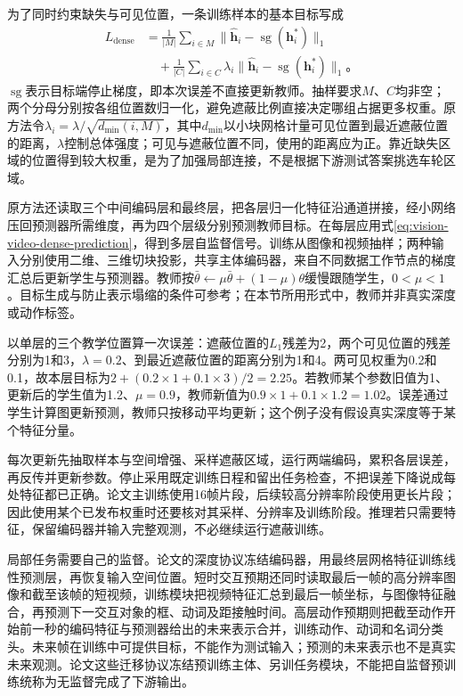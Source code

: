 为了同时约束缺失与可见位置，一条训练样本的基本目标写成
\begin{equation}
 \begin{aligned}
  L_{\mathrm{dense}}
  &=\frac{1}{|M|}\sum_{i\in M}
    \lVert\widehat{\bm{h}}_i-\operatorname{sg}(\bm{h}^{*}_i)\rVert_1
   \\
  &\quad+\frac{1}{|C|}\sum_{i\in C}\lambda_i
    \lVert\widehat{\bm{h}}_i-\operatorname{sg}(\bm{h}^{*}_i)\rVert_1\text{。}
 \end{aligned}
  \label{eq:vision-video-dense-prediction}
\end{equation}
$\operatorname{sg}$表示目标端停止梯度，即本次误差不直接更新教师。抽样要求$M$、$C$均非空；两个分母分别按各组位置数归一化，避免遮蔽比例直接决定哪组占据更多权重。原方法令$\lambda_i=\lambda/\sqrt{d_{\min}(i,M)}$，其中$d_{\min}$以小块网格计量可见位置到最近遮蔽位置的距离，$\lambda$控制总体强度；可见与遮蔽位置不同，使用的距离应为正。靠近缺失区域的位置得到较大权重，是为了加强局部连接，不是根据下游测试答案挑选车轮区域。

原方法还读取三个中间编码层和最终层，把各层归一化特征沿通道拼接，经小网络压回预测器所需维度，再为四个层级分别预测教师目标。在每层应用式\eqref{eq:vision-video-dense-prediction}，得到多层自监督信号。训练从图像和视频抽样；两种输入分别使用二维、三维切块投影，共享主体编码器，来自不同数据工作节点的梯度汇总后更新学生与预测器。教师按$\bar{\theta}\leftarrow\mu\bar{\theta}+(1-\mu)\theta$缓慢跟随学生，$0<\mu<1$。目标生成与防止表示塌缩的条件可参考；在本节所用形式中，教师并非真实深度或动作标签。

以单层的三个教学位置算一次误差：遮蔽位置的$L_1$残差为2，两个可见位置的残差分别为1和3，$\lambda=0.2$、到最近遮蔽位置的距离分别为1和4。两可见权重为0.2和0.1，故本层目标为$2+(0.2\times1+0.1\times3)/2=2.25$。若教师某个参数旧值为1、更新后的学生值为1.2、$\mu=0.9$，教师新值为$0.9\times1+0.1\times1.2=1.02$。误差通过学生计算图更新预测，教师只按移动平均更新；这个例子没有假设真实深度等于某个特征分量。

每次更新先抽取样本与空间增强、采样遮蔽区域，运行两端编码，累积各层误差，再反传并更新参数。停止采用既定训练日程和留出任务检查，不把误差下降说成每处特征都已正确。论文主训练使用16帧片段，后续较高分辨率阶段使用更长片段；因此使用某个已发布权重时还要核对其采样、分辨率及训练阶段。推理若只需要特征，保留编码器并输入完整观测，不必继续运行遮蔽训练。

局部任务需要自己的监督。论文的深度协议冻结编码器，用最终层网格特征训练线性预测层，再恢复输入空间位置。短时交互预期还同时读取最后一帧的高分辨率图像和截至该帧的短视频，训练模块把视频特征汇总到最后一帧坐标，与图像特征融合，再预测下一交互对象的框、动词及距接触时间。高层动作预期则把截至动作开始前一秒的编码特征与预测器给出的未来表示合并，训练动作、动词和名词分类头。未来帧在训练中可提供目标，不能作为测试输入；预测的未来表示也不是真实未来观测。论文这些迁移协议冻结预训练主体、另训任务模块，不能把自监督预训练统称为无监督完成了下游输出。

